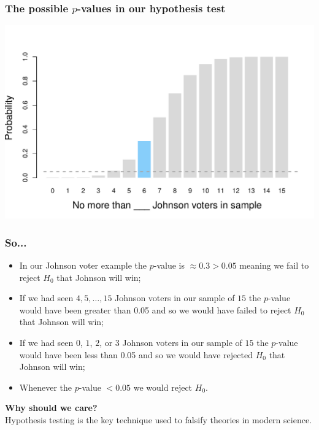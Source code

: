 \documentclass[aspectratio=169]{beamer}
\theoremstyle{principle}
\begin{document}
\begin{frame}
\frametitle{The possible $p$-values in our hypothesis test}

\begin{center}
\includegraphics[scale=0.6]{binomial_CDF.pdf}
\end{center}

\end{frame}

\begin{frame}
\frametitle{So...}

\begin{itemize}
\item In our Johnson voter example the $p$-value is $\approx 0.3>0.05$ meaning we fail to reject $H_0$ that Johnson will win;
\bigskip
\bigskip

\item If we had seen $4, 5,\hdots,15$ Johnson voters in our sample of $15$ the $p$-value would have been greater than 0.05 and so we would have failed to reject $H_0$ that Johnson will win;
\bigskip
\bigskip

\item If we had seen $0$, $1$, $2$, or $3$ Johnson voters in our sample of $15$ the $p$-value would have been less than 0.05 and so we would have rejected $H_0$ that Johnson will win;
\bigskip
\bigskip

\item Whenever the $p$-value $<0.05$ we would reject $H_0$.

\end{itemize}

\end{frame}

\begin{frame}

\begin{center}
\Huge\textbf{Why should we care?}\\
\bigskip
\bigskip
\large Hypothesis testing is the key technique used to falsify theories in modern science.\\
\end{center}

\end{frame}
\end{document}
